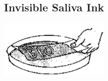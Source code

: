 \begin{multicols}{2}
%
%

\subsection{Invisible Saliva Ink} %

\begin{center}
\includegraphics[width=0.4\textwidth]{./img/source/saliva-ink.png}
\end{center}


\end{multicols}
